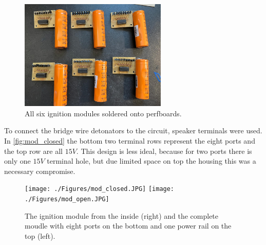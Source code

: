 \begin{figure}[!ht]
    \centering
    \includegraphics[width=7cm]{./Figures/raw_modules.jpeg}
    \caption{All six ignition modules soldered onto perfboards.}
    \label{fig:raw_modules}     
\end{figure}

\noindent To connect the bridge wire detonators to the circuit, speaker terminals were used.  In \cref{fig:mod_closed} the bottom two terminal rows represent the eight ports and the top row are all $15V$. This design is less ideal, because for two ports there is only one $15V$ terminal hole, but due limited space on top the housing this was a necessary compromise.  \\

\begin{figure}[!ht]
    \centering
    \texttt{[image: ./Figures/mod\_closed.JPG]}
    \texttt{[image: ./Figures/mod\_open.JPG]}
    \caption{The ignition module from the inside (right) and the complete moudle with eight ports on the bottom and one power rail on the top (left).}
    \label{fig:mod_open}     
\end{figure}

\pagebreak
